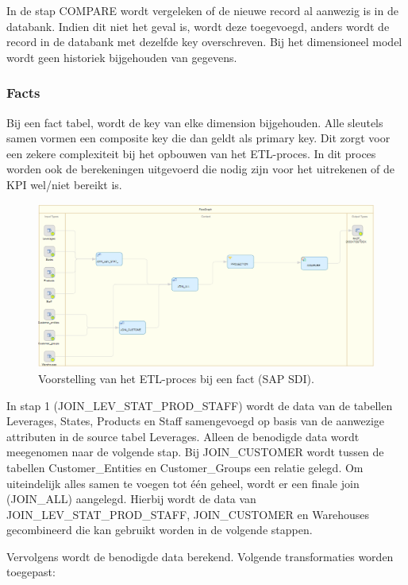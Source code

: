 In de stap COMPARE wordt vergeleken of de nieuwe record al aanwezig is in de databank. Indien dit niet het geval is, wordt deze toegevoegd, anders wordt de record in de databank met dezelfde key overschreven. Bij het dimensioneel model wordt geen historiek bijgehouden van gegevens.

\subsubsection{Facts}
Bij een fact tabel, wordt de key van elke dimension bijgehouden. Alle sleutels samen vormen een composite key die dan geldt als primary key. Dit zorgt voor een zekere complexiteit bij het opbouwen van het ETL-proces. In dit proces worden ook de berekeningen uitgevoerd die nodig zijn voor het uitrekenen of de KPI wel/niet bereikt is.

\begin{figure}[h]
	\centering
	\includegraphics[scale=0.5]{../images/DM_FG_fact.png}
	\caption{Voorstelling van het ETL-proces bij een fact (SAP SDI).}
	\label{fig:DM_FG_fac}
\end{figure}

In stap 1 (JOIN\_LEV\_STAT\_PROD\_STAFF) wordt de data van de tabellen Leverages, States, Products en Staff samengevoegd op basis van de aanwezige attributen in de source tabel Leverages. Alleen de benodigde data wordt meegenomen naar de volgende stap. Bij JOIN\_CUSTOMER wordt tussen de tabellen Customer\_Entities en Customer\_Groups een relatie gelegd. Om uiteindelijk alles samen te voegen tot één geheel, wordt er een finale join (JOIN\_ALL) aangelegd. Hierbij wordt de data van JOIN\_LEV\_STAT\_PROD\_STAFF, JOIN\_CUSTOMER en Warehouses gecombineerd die kan gebruikt worden in de volgende stappen.

Vervolgens wordt de benodigde data berekend. Volgende transformaties worden toegepast:

